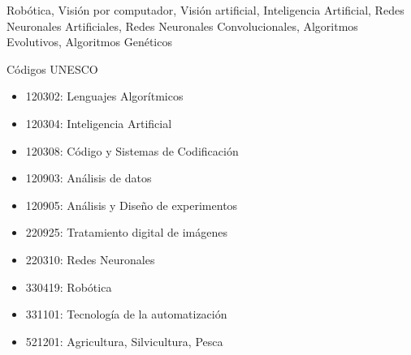 Robótica, Visión por computador, Visión artificial, Inteligencia Artificial, Redes Neuronales Artificiales, Redes Neuronales Convolucionales, Algoritmos Evolutivos, Algoritmos Genéticos

\vspace*{10mm}

{Códigos UNESCO}\label{sec:codigos_unesco} \\ 

\begin{itemize}
    \item 120302: Lenguajes Algorítmicos
    \item 120304: Inteligencia Artificial
    \item 120308: Código y Sistemas de Codificación
    \item 120903: Análisis de datos
    \item 120905: Análisis y Diseño de experimentos
    \item 220925: Tratamiento digital de imágenes
    \item 220310: Redes Neuronales
    \item 330419: Robótica
    \item 331101: Tecnología de la automatización
    \item 521201: Agricultura, Silvicultura, Pesca
\end{itemize}








